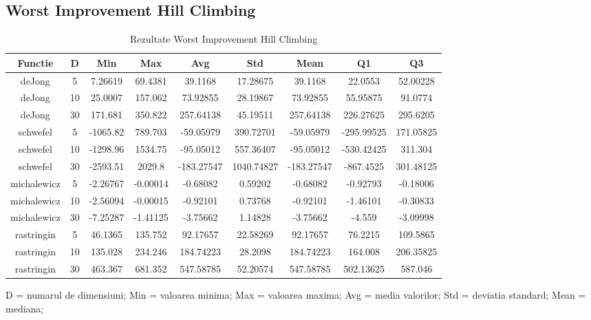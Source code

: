 \documentclass{article}
\begin{document}
\subsection{Worst Improvement Hill Climbing}
\begin{table}[h]
\begin{tabular}{ccccccccc}
\hline
Functie&D&Min&Max&Avg&Std&Mean&Q1&Q3\\
\hline
\hline
deJong&5&7.26619&69.4381&39.1168&17.28675&39.1168&22.0553&52.00228 \\ \hline
deJong&10&25.0007&157.062&73.92855&28.19867&73.92855&55.95875&91.0774 \\ \hline
deJong&30&171.681&350.822&257.64138&45.19511&257.64138&226.27625&295.6205 \\ \hline
\hline
schwefel&5&-1065.82&789.703&-59.05979&390.72701&-59.05979&-295.99525&171.05825 \\ \hline
schwefel&10&-1298.96&1534.75&-95.05012&557.36407&-95.05012&-530.42425&311.304 \\ \hline
schwefel&30&-2593.51&2029.8&-183.27547&1040.74827&-183.27547&-867.4525&301.48125 \\ \hline
\hline
michalewicz&5&-2.26767&-0.00014&-0.68082&0.59202&-0.68082&-0.92793&-0.18006 \\ \hline
michalewicz&10&-2.56094&-0.00015&-0.92101&0.73768&-0.92101&-1.46101&-0.30833 \\ \hline
michalewicz&30&-7.25287&-1.41125&-3.75662&1.14828&-3.75662&-4.559&-3.09998 \\ \hline
\hline
rastringin&5&46.1365&135.752&92.17657&22.58269&92.17657&76.2215&109.5865 \\ \hline
rastringin&10&135.028&234.246&184.74223&28.2098&184.74223&164.008&206.35825 \\ \hline
rastringin&30&463.367&681.352&547.58785&52.20574&547.58785&502.13625&587.046 \\ \hline
\hline
\end{tabular}
\caption{Rezultate Worst Improvement Hill Climbing} \footnotesize{D = numarul de dimensiuni}; {Min = valoarea minima}; {Max = valoarea maxima}; {Avg = media valorilor}; {Std = deviatia standard}; {Mean = mediana};
\end{table}
\end{document}
